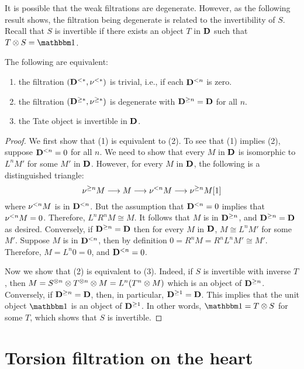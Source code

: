 It is possible that the weak filtrations are degenerate. However, as 
the following result shows, the filtration being degenerate is 
related to the invertibility of $S$. Recall that $S$ is 
invertible if there exists an object $T$ in $\mathbf{D}$ such that $T 
\tensor S = \Unit$.

\begin{prop}\label{prop_filt_trivial_cond}
The following are equivalent:
\begin{enumerate}
\item the filtration $(\mathbf{D}^{< *}, \nu^{< *})$ is trivial,
  i.e., if each $\mathbf{D}^{< n}$ is zero.

\item the filtration $(\mathbf{D}^{\geq *}, \nu^{\geq *})$ is 
degenerate with $\mathbf{D}^{\geq n} = \mathbf{D}$ for all $n$.

\item the Tate object is invertible in $\mathbf{D}$.
\end{enumerate}
\end{prop}
\begin{proof}
We first show that (1) is equivalent to (2). To see that (1) implies
(2), suppose $\mathbf{D}^{< n} = 0$ for all $n$. We need to show
that every $M$ in $\mathbf{D}$ is isomorphic to $L^n M'$ for some $M'$
in $\mathbf{D}$. However, for every $M$ in $\mathbf{D}$, the following is
a distinguished triangle:
\[
\nu^{\geq n}M \longrightarrow M \longrightarrow \nu^{< n}M \longrightarrow \nu^{\geq n} M[1]
\]
where $\nu^{< n}M$ is in $\mathbf{D}^{< n}$. But the assumption that
$\mathbf{D}^{< n} = 0$ implies that $\nu^{< n}M = 0$. Therefore, $L^n R^n M
\cong M$. It follows that $M$ is in $\mathbf{D}^{\geq n}$, and
$\mathbf{D}^{\geq n} = \mathbf{D}$ as desired. Conversely, if
$\mathbf{D}^{\geq n} = \mathbf{D}$ then for every $M$ in $\mathbf{D}$, $M \cong
L^n M'$ for some $M'$. Suppose $M$ is in $\mathbf{D}^{< n}$, then by
definition $0 = R^n M = R^nL^n M' \cong M'$.  Therefore, $M = L^n 0 =
0$, and $\mathbf{D}^{< n} = 0$.

Now we show that (2) is equivalent to (3). Indeed, if $S$ is 
invertible with inverse $T$, then $M = S^{\otimes n} \otimes 
T^{\otimes n} \otimes M = L^n(T^n \otimes M)$ which is an object 
of $\mathbf{D}^{\geq n}$. Conversely, if $\mathbf{D}^{\geq n} = 
\mathbf{D}$, then, in particular, $\mathbf{D}^{\geq 1} = \mathbf{D}$. This
implies that the unit object $\Unit$ is an object of $\mathbf{D}^{\geq 1}$.
In other words, $\Unit = T \tensor S$ for some $T$, which shows
that $S$ is invertible.
\end{proof}

\section{Torsion filtration on the heart}

